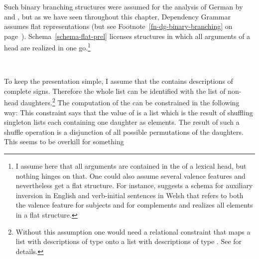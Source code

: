 Such binary branching structures were assumed for the analysis of German by \citet{Kathol95a,Kathol2000a} and
\citet{Mueller95c,Babel,Mueller99a,Mueller2002b}, but as we have seen throughout this chapter, Dependency
Grammar assumes flat representations (but see Footnote~\ref{fn-dg-binary-branching} on
page~\pageref{fn-dg-binary-branching}). Schema~\ref{schema-flat-prel} licenses structures in which
all arguments of a head are realized in one go.\footnote{%
I assume here that all arguments are contained in the \compsl of a
lexical head, but nothing hinges on that. One could also assume several valence features and
nevertheless get a flat structure. For instance, \citet[]{Borsley89} suggests a schema for auxiliary inversion in
English and verb-initial sentences in Welsh that refers to both the valence feature for subjects and for complements and realizes all
elements in a flat structure.%
}
\begin{schema}
\label{schema-flat-prel}
 \impl\\
\end{schema}
To keep the presentation simple, I assume that the \compsl contains descriptions of complete
signs. Therefore the whole list can be identified with the list of non-head daughters.\footnote{%
  Without this assumption one would need a relational constraint that maps a list with descriptions of type
   onto a list with descriptions of type . See  for details.
}
The computation of the \domv can be constrained in the following way:
\ea
{} \impl
{}
\z
This constraint says that the value of \dom is a list which is the result of shuffling singleton
lists each containing one daughter as elements. The result of such a shuffle operation is a
disjunction of all possible permutations of the daughters. This seems to be overkill for something
